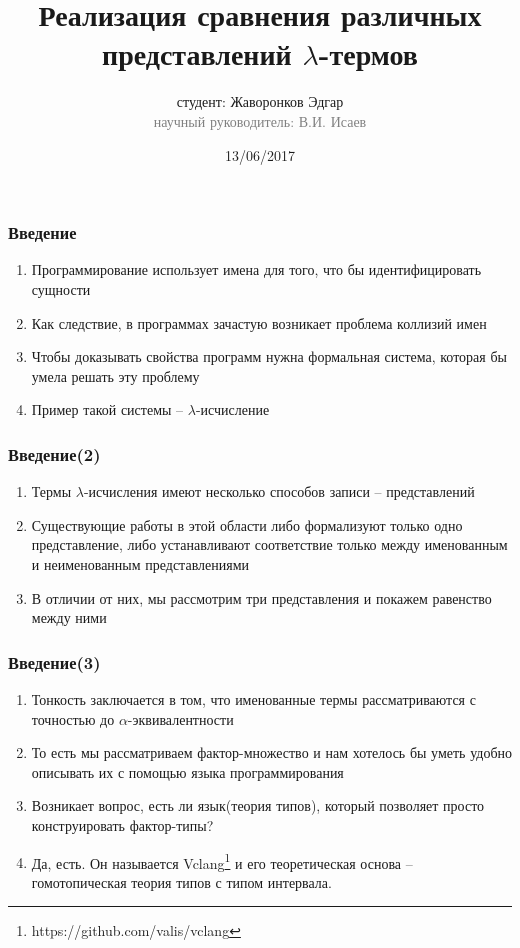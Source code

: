 \documentclass{beamer}
\begin{document}
\title[]{Реализация сравнения различных представлений \texorpdfstring{$\lambda$}{лямбда}-термов}
\author[Жаворонков Э.А.]{студент: Жаворонков Эдгар\\{\footnotesize\textcolor{gray}{научный руководитель: В.И. Исаев}}}
\date{13/06/2017}

\frame{\titlepage}

\begin{frame}\frametitle{Введение}
    \begin{enumerate}
        \item Программирование использует имена для того, что бы идентифицировать сущности
        \item Как следствие, в программах зачастую возникает проблема коллизий имен
        \item Чтобы доказывать свойства программ нужна формальная система, которая бы умела решать эту проблему
        \item Пример такой системы -- $\lambda$-исчисление
    \end{enumerate}
\end{frame}


\begin{frame}\frametitle{Введение(2)}
    \begin{enumerate}
        \item Термы $\lambda$-исчисления имеют несколько способов записи -- представлений
        \item Существующие работы в этой области либо формализуют только одно представление, либо устанавливают соответствие только между именованным и неименованным представлениями
        \item В отличии от них, мы рассмотрим три представления и покажем равенство между ними
    \end{enumerate}
\end{frame}


\begin{frame}\frametitle{Введение(3)}
    \begin{enumerate}
        \item Тонкость заключается в том, что именованные термы рассматриваются с точностью до $\alpha$-эквивалентности
        \item То есть мы рассматриваем фактор-множество и нам хотелось бы уметь удобно описывать их с помощью языка программирования
        \item Возникает вопрос, есть ли язык(теория типов), который позволяет просто конструировать фактор-типы?
        \item <2-> Да, есть. Он называется Vclang\footnote{https://github.com/valis/vclang} и его теоретическая основа -- гомотопическая теория типов с типом интервала. %
    \end{enumerate}
\end{frame}
\end{document}
